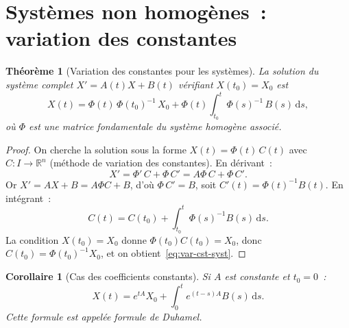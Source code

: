 \documentclass[12pt,a4paper,openany]{book}
\theoremstyle{definition}
\theoremstyle{plain}
\newtheorem{theoreme}[definition]{Théorème}
\newtheorem{corollaire}[definition]{Corollaire}
\theoremstyle{remark}
\newcommand{\R}{\mathbb{R}}
\newcommand{\dd}{\mathrm{d}}
\begin{document}
\section{Systèmes non homogènes~: variation des constantes}\label{sec:syst-variation-cst}

\begin{theoreme}[Variation des constantes pour les systèmes]\label{thm:var-cst-syst}
  La solution du système complet $X' = A(t)X + B(t)$ vérifiant
  $X(t_0) = X_0$ est
  \begin{equation}\label{eq:var-cst-syst}
    X(t) = \Phi(t)\,\Phi(t_0)^{-1}\,X_0
         + \Phi(t)\int_{t_0}^{t} \Phi(s)^{-1}\,B(s)\,\dd s,
  \end{equation}
  où $\Phi$ est une matrice fondamentale du système homogène associé.
\end{theoreme}

\begin{proof}
  On cherche la solution sous la forme $X(t) = \Phi(t)\,C(t)$ avec
  $C \colon I \to \R^n$ (méthode de variation des constantes).
  En dérivant~:
  \[
    X' = \Phi'\,C + \Phi\,C' = A\Phi\,C + \Phi\,C'.
  \]
  Or $X' = AX + B = A\Phi C + B$, d'où $\Phi\,C' = B$,
  soit $C'(t) = \Phi(t)^{-1}B(t)$. En intégrant~:
  \[
    C(t) = C(t_0) + \int_{t_0}^t \Phi(s)^{-1}B(s)\,\dd s.
  \]
  La condition $X(t_0) = X_0$ donne $\Phi(t_0)C(t_0) = X_0$,
  donc $C(t_0) = \Phi(t_0)^{-1}X_0$, et on obtient~\eqref{eq:var-cst-syst}.
\end{proof}

\begin{corollaire}[Cas des coefficients constants]\label{cor:var-cst-cst}
  Si $A$ est constante et $t_0 = 0$~:
  \begin{equation}\label{eq:duhamel}
    X(t) = e^{tA}X_0 + \int_0^t e^{(t-s)A}B(s)\,\dd s.
  \end{equation}
  Cette formule est appelée \emph{formule de Duhamel}.
\end{corollaire}
\end{document}
